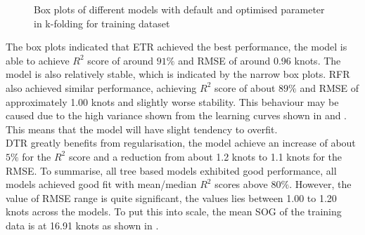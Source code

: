 \begin{figure}[ht]
    \centering
    \caption{Box plots of different models with default and optimised parameter in k-folding for training dataset}
    \label{fig:train_boxplot_r2_rmse}
\end{figure}

The box plots indicated that ETR achieved the best performance, the model is able to achieve $R^2$ score of around $91\%$ and RMSE of around 0.96 knots. The model is also relatively stable, which is indicated by the narrow box plots. RFR also achieved similar performance, achieving $R^2$ score of about $89\%$ and RMSE of approximately 1.00 knots and slightly worse stability. This behaviour may be caused due to the high variance shown from the learning curves shown in  and . This means that the model will have slight tendency to overfit.\\

DTR greatly benefits from regularisation, the model achieve an increase of about $5\%$ for the $R^2$ score and a reduction from about 1.2 knots to 1.1 knots for the RMSE. To summarise, all tree based models exhibited good performance, all models achieved good fit with mean/median $R^2$ scores above $80\%$. However, the value of RMSE range is quite significant, the values lies between 1.00 to 1.20 knots across the models. To put this into scale, the mean SOG of the training data is at 16.91 knots as shown in .\\  

